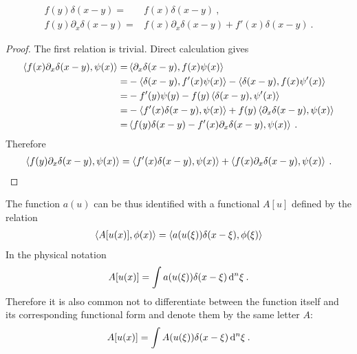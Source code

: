 \begin{lemma} \label{lemma:delta}
    \begin{align}
        f(y) \delta (x-y) =& f(x) \delta(x-y) \:, \\
        f(y) \partial_x \delta(x-y) =& f(x) \partial_x \delta(x-y) + f'(x) \delta(x-y) \:.
    \end{align}
\end{lemma}
\begin{proof}
    The first relation is trivial.
    Direct calculation gives
    \begin{align*}
        \left \langle f(x) \partial_x \delta(x-y) ,\psi(x) \right \rangle 
        =& \left \langle \partial_x \delta(x-y) ,f(x) \psi(x) \right \rangle 
         \\ =& -\left \langle \delta(x-y) ,f'(x)\psi(x) \right \rangle - \left \langle \delta(x-y) ,f(x)\psi'(x) \right \rangle 
         \\ =& -f'(y) \psi(y) - f(y) \left \langle \delta(x-y) ,\psi'(x) \right \rangle 
         \\ =& - \left \langle f'(x)  \delta(x-y) ,\psi(x) \right \rangle + f(y) \left \langle \partial_x \delta(x-y) ,\psi(x) \right \rangle 
         \\ =& \left \langle f(y) \delta(x-y) - f'(x) \partial_x \delta(x-y) ,\psi(x) \right \rangle \:.
    \end{align*}
    Therefore
    \begin{align}
        \left \langle f(y) \partial_x \delta(x-y) ,\psi(x) \right \rangle = \left \langle f'(x) \delta(x-y) ,\psi(x) \right \rangle + \left \langle f(x) \partial_x \delta(x-y) ,\psi(x) \right \rangle \:.
    \end{align} 
\end{proof}


The function $a(u)$ can be thus identified with a functional $A[u]$ defined by the relation
\begin{align}
    \left \langle A[u(x)] ,\phi(x) \right \rangle  = \left \langle a(u(\xi)) \delta(x-\xi) ,\phi(\xi) \right \rangle
\end{align}
In the physical notation
\begin{align}
    A[u(x)] = \int a(u(\xi)) \delta(x-\xi) \, \mathrm{d}^n \xi \:.
\end{align}
Therefore it is also common not to differentiate between the function itself and its corresponding functional form and denote them by the same letter $A$:
\begin{align}
    A[u(x)] = \int A(u(\xi)) \delta(x-\xi) \, \mathrm{d}^n \xi \:.
\end{align}




